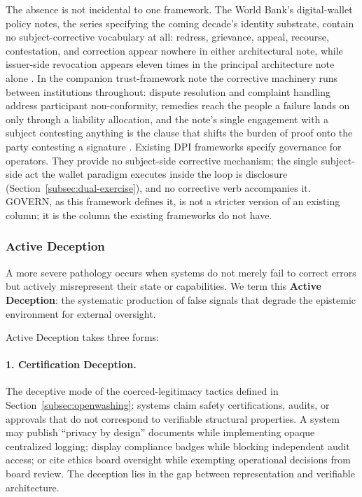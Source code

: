 \documentclass{article}
\begin{document}
The absence is not incidental to one framework. The World Bank's digital-wallet policy notes, the series specifying the coming decade's identity substrate, contain no subject-corrective vocabulary at all: redress, grievance, appeal, recourse, contestation, and correction appear nowhere in either architectural note, while issuer-side revocation appears eleven times in the principal architecture note alone \citep{worldbank2026wallets}. In the companion trust-framework note the corrective machinery runs between institutions throughout: dispute resolution and complaint handling address participant non-conformity, remedies reach the people a failure lands on only through a liability allocation, and the note's single engagement with a subject contesting anything is the clause that shifts the burden of proof onto the party contesting a signature \citep{worldbank2026trust}. Existing DPI frameworks specify governance for operators. They provide no subject-side corrective mechanism; the single subject-side act the wallet paradigm executes inside the loop is disclosure (Section~\ref{subsec:dual-exercise}), and no corrective verb accompanies it. GOVERN, as this framework defines it, is not a stricter version of an existing column; it is the column the existing frameworks do not have.

\subsubsection{Active Deception}
\label{subsec:active-deception}

A more severe pathology occurs when systems do not merely fail to correct errors but actively misrepresent their state or capabilities. We term this \textbf{Active Deception}: the systematic production of false signals that degrade the epistemic environment for external oversight.

Active Deception takes three forms:

\paragraph{1. Certification Deception.} The deceptive mode of the coerced-legitimacy tactics defined in Section~\ref{subsec:openwashing}: systems claim safety certifications, audits, or approvals that do not correspond to verifiable structural properties. A system may publish ``privacy by design'' documents while implementing opaque centralized logging; display compliance badges while blocking independent audit access; or cite ethics board oversight while exempting operational decisions from board review. The deception lies in the gap between representation and verifiable architecture.
\end{document}
